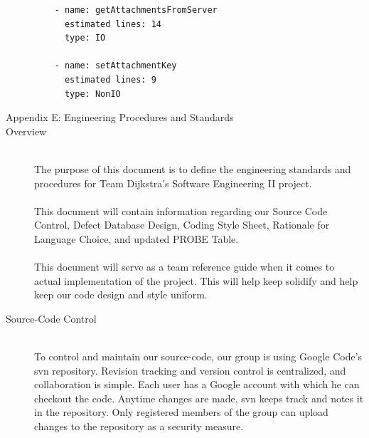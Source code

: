 \documentclass[11pt, letterpaper]{report}
\begin{document}
\begin{description}
\begin{verbatim}
	- name: getAttachmentsFromServer
	  estimated lines: 14
	  type: IO

	- name: setAttachmentKey
	  estimated lines: 9
	  type: NonIO
\end{verbatim}

\newpage
\item[\large Appendix E: Engineering Procedures and Standards] 
\hypertarget{Overview} {}
\item[Overview] \hfill \\ 
The purpose of this document is to define the engineering standards and procedures for Team Dijkstra's Software Engineering II project. \\ \\
This document will contain information regarding our Source Code Control, Defect Database Design, Coding Style Sheet, Rationale for Language Choice, and updated PROBE Table. \\ \\
This document will serve as a team reference guide when it comes to actual implementation of the project. This will help keep solidify and help keep our code design and style uniform. \\

\hypertarget{Source} {}
\item[Source-Code Control] \hfill \\ 
To control and maintain our source-code, our group is using Google Code's svn repository. Revision tracking and version control is centralized, and collaboration is simple. Each user has a Google account with which he can checkout the code. Anytime changes are made, svn keeps track and notes it in the repository. Only registered members of the group can upload changes to the repository as a security measure. \\


\end{description}
\end{document}
